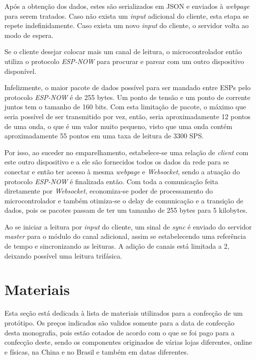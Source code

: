 Após a obtenção dos dados, estes são serializados em JSON e enviados à \textit{webpage} para serem tratados. Caso não exista um \textit{input} adicional do cliente, esta etapa se repete indefinidamente. Caso exista um novo \textit{input} do cliente, o servidor volta ao modo de espera.

Se o cliente desejar colocar mais um canal de leitura, o microcontrolador então utiliza o protocolo \textit{ESP-NOW} para procurar e parear com um outro dispositivo disponível.

Infelizmente, o maior pacote de dados possível para ser mandado entre ESPs pelo protocolo \textit{ESP-NOW} é de 255 bytes. Um ponto de tensão e um ponto de corrente juntos tem o tamanho de 160 bits. Com esta limitação de pacote, o máximo que seria possível de ser transmitido por vez, então, seria aproximadamente 12 pontos de uma onda, o que é um valor muito pequeno, visto que uma onda contém aproximadamente 55 pontos em uma taxa de leitura de 3300 \gls{SPS}.

Por isso, ao suceder no emparelhamento, estabelece-se uma relação de \textit{client} com este outro dispositivo e a ele são fornecidos todos os dados da rede para se conectar e então ter acesso à mesma \textit{webpage} e \textit{Websocket}, sendo a atuação do protocolo \textit{ESP-NOW} é finalizada então. Com toda a comunicação feita diretamente por \textit{Websocket}, economiza-se poder de processamento do microcontrolador e também otimiza-se o delay de comunicação e a transição de dados, pois os pacotes passam de ter um tamanho de 255 bytes para 5 kilobytes.

Ao se iniciar a leitura por \textit{input} do cliente, um sinal de \textit{sync} é enviado do servidor \textit{master} para o módulo do canal adicional, assim se estabelecendo uma referência de tempo e sincronizando as leituras. A adição de canais está limitada a 2, deixando possível uma leitura trifásica.





\section{Materiais}\label{sec:materiais}

Esta seção está dedicada à lista de materiais utilizados para a confecção de um protótipo. Os preços indicados são validos somente para a data de confecção desta monografia, pois estão cotados de acordo com o que se foi pago para a confecção deste, sendo os componentes originados de várias lojas diferentes, online e físicas, na China e no Brasil e também em datas diferentes.

